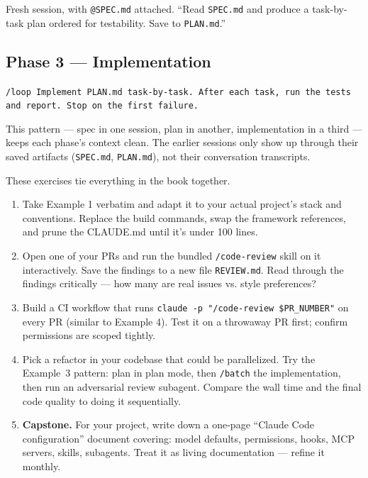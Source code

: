 Fresh session, with \texttt{@SPEC.md} attached. ``Read \texttt{SPEC.md}
and produce a task-by-task plan ordered for testability. Save to
\texttt{PLAN.md}.''

\subsection{Phase 3 — Implementation}

\texttt{/loop Implement \texttt{PLAN.md} task-by-task. After each task,
run the tests and report. Stop on the first failure.}

This pattern — spec in one session, plan in another, implementation in a
third — keeps each phase's context clean. The earlier sessions only show
up through their saved artifacts (\texttt{SPEC.md}, \texttt{PLAN.md}),
not their conversation transcripts.

\begin{exercisebox}
These exercises tie everything in the book together.

\begin{enumerate}
  \item Take Example 1 verbatim and adapt it to your actual project's
        stack and conventions. Replace the build commands, swap the
        framework references, and prune the CLAUDE.md until it's under
        100 lines.
  \item Open one of your PRs and run the bundled \texttt{/code-review}
        skill on it interactively. Save the findings to a new file
        \texttt{REVIEW.md}. Read through the findings critically — how
        many are real issues vs. style preferences?
  \item Build a CI workflow that runs \texttt{claude -p "/code-review
        \$PR\_NUMBER"} on every PR (similar to Example 4). Test it on a
        throwaway PR first; confirm permissions are scoped tightly.
  \item Pick a refactor in your codebase that could be parallelized.
        Try the Example~3 pattern: plan in plan mode, then
        \texttt{/batch} the implementation, then run an adversarial
        review subagent. Compare the wall time and the final code
        quality to doing it sequentially.
  \item \textbf{Capstone.} For your project, write down a one-page
        ``Claude Code configuration'' document covering: model defaults,
        permissions, hooks, MCP servers, skills, subagents. Treat it as
        living documentation — refine it monthly.
\end{enumerate}
\end{exercisebox}

